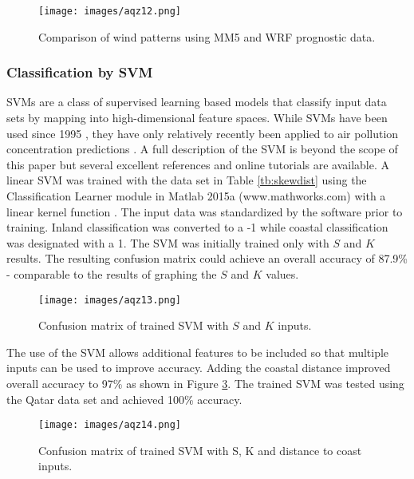 %
\begin{figure}[!htb]
\texttt{[image: images/aqz12.png]} 
\caption[Comparison of wind patterns using prognostic data]{Comparison of wind patterns using MM5 and WRF prognostic data.}
\label{fig:12windcompare}
\end{figure}
%

\subsubsection{Classification by SVM}

SVMs are a class of supervised learning based models that classify input data sets by mapping into high-dimensional feature spaces. While SVMs have been used since 1995 \citep{Cortes1995}, they have only relatively recently been applied to air pollution concentration predictions \citep{Lu2005, Luna2014, Moazami2016}. A full description of the SVM is beyond the scope of this paper but several excellent references and online tutorials are available. A linear SVM was trained with the data set in Table \ref{tb:skewdist} using the Classification Learner module in Matlab 2015a (www.mathworks.com) with a linear kernel function \citep{Yang2011}. The input data was standardized by the software prior to training. Inland classification was converted to a -1 while coastal classification was designated with a 1. The SVM was initially trained only with $S$ and $K$ results. The resulting confusion matrix could achieve an overall accuracy of 87.9\% - comparable to the results of graphing the $S$ and $K$ values.  

%
\begin{figure}[!htb]
\texttt{[image: images/aqz13.png]} 
\caption{Confusion matrix of trained SVM with $S$ and $K$ inputs.}
\label{fig:13confusionSK}
\end{figure}
%

The use of the SVM allows additional features to be included so that multiple inputs can be used to improve accuracy. Adding the coastal distance improved overall accuracy to 97\% as shown in Figure \ref{fig:14confusionSKdist}. The trained SVM was tested using the Qatar data set and achieved 100\% accuracy. 

%
\begin{figure}[!htb]
\texttt{[image: images/aqz14.png]} 
\caption{Confusion matrix of trained SVM with S, K and distance to coast inputs.}
\label{fig:14confusionSKdist}
\end{figure}
%
 
